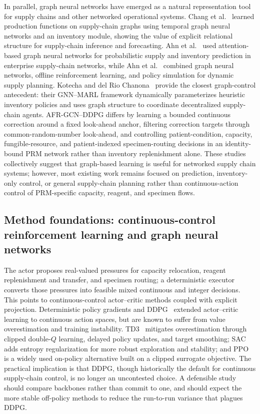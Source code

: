 \documentclass[preprint,review,12pt]{elsarticle}
\begin{document}
In parallel, graph neural networks have emerged as a natural representation tool for supply chains and other networked operational systems. Chang et al.~\cite{Chang2025AAAI} learned production functions on supply-chain graphs using temporal graph neural networks and an inventory module, showing the value of explicit relational structure for supply-chain inference and forecasting. Ahn et al.~\cite{Ahn2024GSP} used attention-based graph neural networks for probabilistic supply and inventory prediction in enterprise supply-chain networks, while Ahn et al.~\cite{Ahn2024GPP} combined graph neural networks, offline reinforcement learning, and policy simulation for dynamic supply planning. Kotecha and del Rio Chanona~\cite{Kotecha2025GNNMARL} provide the closest graph-control antecedent: their GNN--MARL framework dynamically parameterizes heuristic inventory policies and uses graph structure to coordinate decentralized supply-chain agents. AFR-GCN--DDPG differs by learning a bounded continuous correction around a fixed look-ahead anchor, filtering correction targets through common-random-number look-ahead, and controlling patient-condition, capacity, fungible-resource, and patient-indexed specimen-routing decisions in an identity-bound PRM network rather than inventory replenishment alone. These studies collectively suggest that graph-based learning is useful for networked supply chain systems; however, most existing work remains focused on prediction, inventory-only control, or general supply-chain planning rather than continuous-action control of PRM-specific capacity, reagent, and specimen flows.

\subsection{Method foundations: continuous-control reinforcement learning and graph neural networks}
The actor proposes real-valued pressures for capacity relocation, reagent replenishment and transfer, and specimen routing; a deterministic executor converts those pressures into feasible mixed continuous and integer decisions. This points to continuous-control actor--critic methods coupled with explicit projection. Deterministic policy gradients and DDPG~\cite{Lillicrap2016DDPG} extended actor--critic learning to continuous action spaces, but are known to suffer from value overestimation and training instability. TD3~\cite{Fujimoto2018TD3} mitigates overestimation through clipped double-$Q$ learning, delayed policy updates, and target smoothing; SAC~\cite{Haarnoja2018SAC} adds entropy regularization for more robust exploration and stability; and PPO~\cite{Schulman2017PPO} is a widely used on-policy alternative built on a clipped surrogate objective. The practical implication is that DDPG, though historically the default for continuous supply-chain control, is no longer an uncontested choice. A defensible study should compare backbones rather than commit to one, and should expect the more stable off-policy methods to reduce the run-to-run variance that plagues DDPG.
\end{document}
